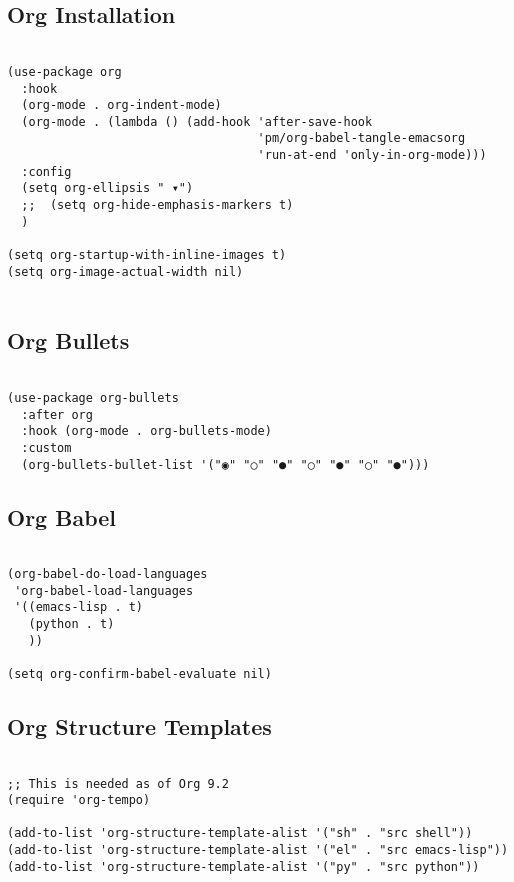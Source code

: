 \documentclass[11pt]{article}
\begin{document}
\subsection{Org Installation}
\label{sec:org85bc79c}
\begin{verbatim}

(use-package org
  :hook
  (org-mode . org-indent-mode)
  (org-mode . (lambda () (add-hook 'after-save-hook
								   'pm/org-babel-tangle-emacsorg
								   'run-at-end 'only-in-org-mode)))
  :config
  (setq org-ellipsis " ▾")
  ;;  (setq org-hide-emphasis-markers t)
  )

(setq org-startup-with-inline-images t)
(setq org-image-actual-width nil)


\end{verbatim}

\subsection{Org Bullets}
\label{sec:org4d0ad09}

\begin{verbatim}

(use-package org-bullets
  :after org
  :hook (org-mode . org-bullets-mode)
  :custom
  (org-bullets-bullet-list '("◉" "○" "●" "○" "●" "○" "●")))

\end{verbatim}

\subsection{Org Babel}
\label{sec:orga7dd81b}
\begin{verbatim}

(org-babel-do-load-languages
 'org-babel-load-languages
 '((emacs-lisp . t)
   (python . t)
   ))

(setq org-confirm-babel-evaluate nil)

\end{verbatim}

\subsection{Org Structure Templates}
\label{sec:orgc06c933}

\begin{verbatim}

;; This is needed as of Org 9.2
(require 'org-tempo)

(add-to-list 'org-structure-template-alist '("sh" . "src shell"))
(add-to-list 'org-structure-template-alist '("el" . "src emacs-lisp"))
(add-to-list 'org-structure-template-alist '("py" . "src python"))

\end{verbatim}
\end{document}
